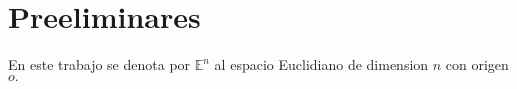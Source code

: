 \chapter*{Preeliminares}

En este trabajo se denota por $\mathbb E^n$ al espacio Euclidiano de dimension $n$ con origen $o.$ %